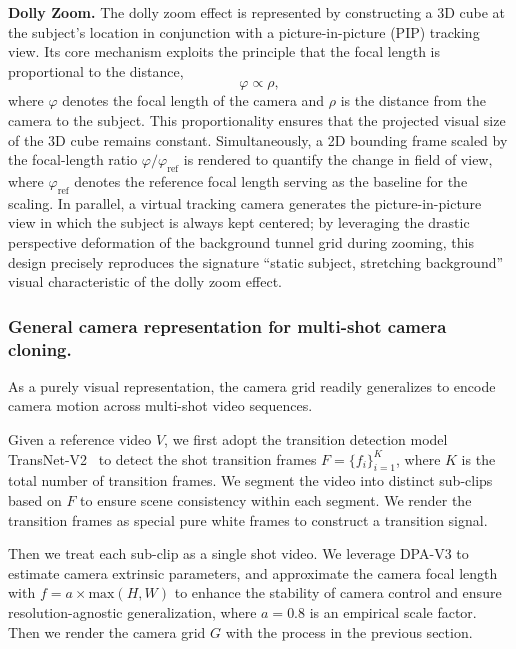 \documentclass[letterpaper]{article} %
\begin{document}
\textbf{Dolly Zoom.}
The dolly zoom effect is represented by constructing a 3D cube at the subject's location in conjunction with a picture-in-picture (PIP) tracking view. Its core mechanism exploits the principle that the focal length is proportional to the distance,
\begin{equation}
    \varphi \propto \rho,
\end{equation}
where $\varphi$ denotes the focal length of the camera and $\rho$ is the distance from the camera to the subject. This proportionality ensures that the projected visual size of the 3D cube remains constant. Simultaneously, a 2D bounding frame scaled by the focal-length ratio $\varphi / \varphi_{\mathrm{ref}}$ is rendered to quantify the change in field of view, where $\varphi_{\mathrm{ref}}$ denotes the reference focal length serving as the baseline for the scaling. In parallel, a virtual 
tracking camera generates the picture-in-picture view in which the 
subject is always kept centered; by leveraging the drastic perspective deformation of the background tunnel grid during zooming, this design precisely reproduces the signature ``static subject, stretching background'' visual characteristic of the dolly zoom effect.


\subsubsection{General camera representation for multi-shot camera cloning.}
As a purely visual representation, the camera grid readily generalizes to encode camera motion across multi-shot video sequences.

Given a reference video $V$, we first adopt the transition detection model TransNet-V2~\cite{soucek2024transnetv2} to detect the shot transition frames $F=\{f_i\}_{i=1}^{K}$, where $K$ is the total number of transition frames. We segment the video into distinct sub-clips based on $F$ to ensure scene consistency within each segment. We render the transition frames as special pure white frames to construct a transition signal. 

Then we treat each sub-clip as a single shot video. We leverage DPA-V3 \cite{lin2025dpa3} to estimate camera extrinsic parameters, and approximate the camera focal length with $f=a\times \text{max}(H, W)$ to enhance the stability of camera control and ensure resolution-agnostic generalization, where $a=0.8$ is an empirical scale factor. Then we render the camera grid $G$ with the process in the previous section.
\end{document}
